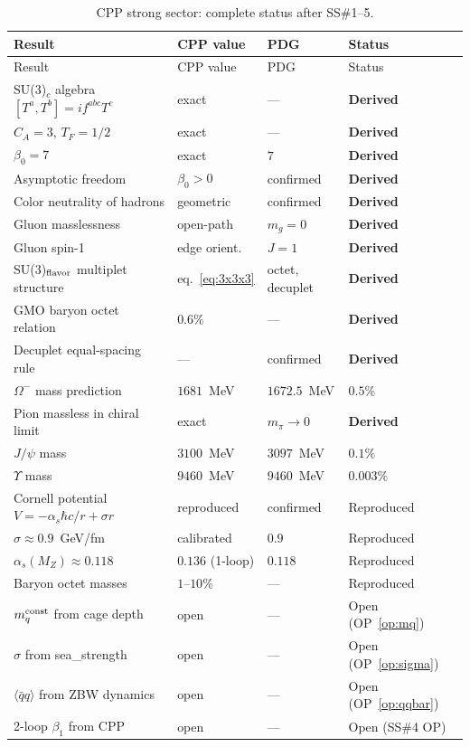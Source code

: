 \documentclass[11pt,a4paper]{article}
\newcommand{\as}{\alpha_s}
\newcommand{\qqbar}{\langle\bar{q}q\rangle}
\begin{document}
\begin{longtable}{@{}p{5cm}p{2cm}p{2cm}l@{}}
\caption{CPP strong sector: complete status after SS\#1--5.}
\label{tab:status}\\
\toprule
Result & CPP value & PDG & Status \\
\midrule
\endfirsthead
\toprule
Result & CPP value & PDG & Status \\
\midrule
\endhead
\bottomrule
\endfoot
SU(3)$_c$ algebra $[T^a,T^b]=if^{abc}T^c$ & exact & --- & \textbf{Derived} \\
$C_A=3$, $T_F=1/2$ & exact & --- & \textbf{Derived} \\
$\beta_0 = 7$ & exact & $7$ & \textbf{Derived} \\
Asymptotic freedom & $\beta_0>0$ & confirmed & \textbf{Derived} \\
Color neutrality of hadrons & geometric & confirmed & \textbf{Derived} \\
Gluon masslessness & open-path & $m_g=0$ & \textbf{Derived} \\
Gluon spin-1 & edge orient. & $J=1$ & \textbf{Derived} \\
SU(3)$_{\rm flavor}$ multiplet structure & eq.~\eqref{eq:3x3x3} & octet, decuplet & \textbf{Derived} \\
GMO baryon octet relation & $0.6\%$ & --- & \textbf{Derived} \\
Decuplet equal-spacing rule & --- & confirmed & \textbf{Derived} \\
$\Omega^-$ mass prediction & $1681$~MeV & $1672.5$~MeV & $0.5\%$ \\
Pion massless in chiral limit & exact & $m_\pi\to0$ & \textbf{Derived} \\
$J/\psi$ mass & $3100$~MeV & $3097$~MeV & $0.1\%$ \\
$\Upsilon$ mass & $9460$~MeV & $9460$~MeV & $0.003\%$ \\
Cornell potential $V=-\as\hbar c/r+\sigma r$ & reproduced & confirmed & Reproduced \\
$\sigma \approx 0.9$~GeV/fm & calibrated & $0.9$ & Reproduced \\
$\as(M_Z)\approx0.118$ & $0.136$ (1-loop) & $0.118$ & Reproduced \\
Baryon octet masses & $1\text{--}10\%$ & --- & Reproduced \\
\midrule
$m_q^{\rm const}$ from cage depth & open & --- & Open (OP~\ref{op:mq}) \\
$\sigma$ from sea\_strength & open & --- & Open (OP~\ref{op:sigma}) \\
$\qqbar$ from ZBW dynamics & open & --- & Open (OP~\ref{op:qqbar}) \\
2-loop $\beta_1$ from CPP & open & --- & Open (SS\#4 OP) \\
\end{longtable}
\end{document}
